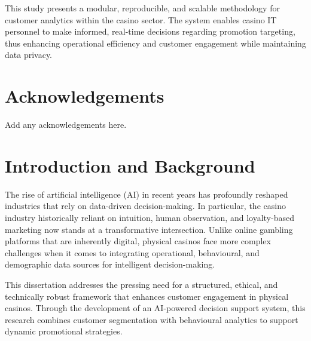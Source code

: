\documentclass[12pt,a4paper]{report}
\begin{document}
This study presents a modular, reproducible, and scalable methodology for customer analytics within the casino sector. The system enables casino IT personnel to make informed, real-time decisions regarding promotion targeting, thus enhancing operational efficiency and customer engagement while maintaining data privacy.



\newpage

\listoffigures
\newpage

\listoftables
\newpage

\chapter*{Acknowledgements}

Add any acknowledgements here.

\newpage
\setcounter{page}{1}

\chapter{Introduction and Background}

The rise of artificial intelligence (AI) in recent years has profoundly reshaped industries that rely on data-driven decision-making. In particular, the casino industry historically reliant on intuition, human observation, and loyalty-based marketing now stands at a transformative intersection. Unlike online gambling platforms that are inherently digital, physical casinos face more complex challenges when it comes to integrating operational, behavioural, and demographic data sources for intelligent decision-making.

This dissertation addresses the pressing need for a structured, ethical, and technically robust framework that enhances customer engagement in physical casinos. Through the development of an AI-powered decision support system, this research combines customer segmentation with behavioural analytics to support dynamic promotional strategies.



\end{document}

